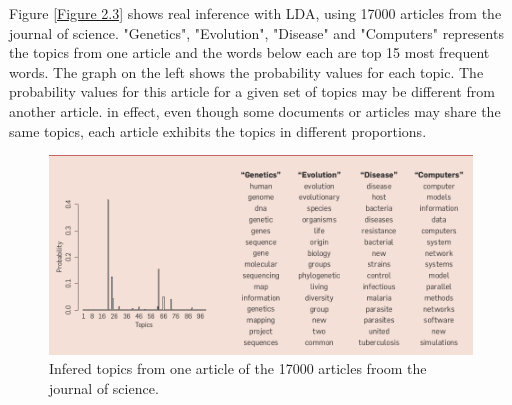 Figure \eqref{Figure 2.3} shows real inference with LDA, using 17000 articles from the journal of science. "Genetics", "Evolution", "Disease" and "Computers" represents the topics  from one article and the words below each are top 15 most frequent words. The graph on the left shows the probability values for each topic.
The probability values for this article for a given set of topics may be different from another article. in effect, even though some documents or articles may share the same topics, each article exhibits the topics in different proportions.
\begin{figure}[hbtp]
\centering
\includegraphics[scale=0.5]{infered_topics.png}
\caption{Infered topics from one article of the 17000 articles froom the journal of science.}
\label{Figure 2.2}
 \end{figure} 
